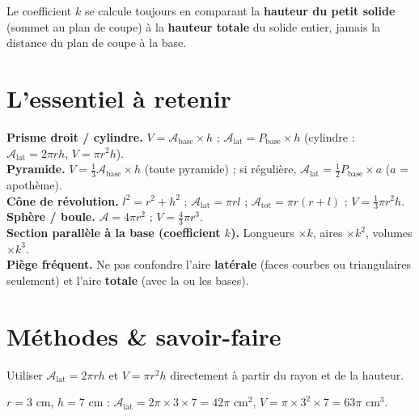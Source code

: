 \begin{remarque}
Le coefficient $k$ se calcule toujours en comparant la \textbf{hauteur du petit solide}
(sommet au plan de coupe) à la \textbf{hauteur totale} du solide entier, jamais la distance
du plan de coupe à la base.
\end{remarque}

\section{L'essentiel à retenir}

\begin{synthese}
\textbf{Prisme droit / cylindre.} $V=\mathcal{A}_{\text{base}}\times h$ ;
$\mathcal{A}_{\text{lat}}=P_{\text{base}}\times h$ (cylindre : $\mathcal{A}_{\text{lat}}=2\pi rh$,
$V=\pi r^{2}h$).\\[4pt]
\textbf{Pyramide.} $V=\frac13\mathcal{A}_{\text{base}}\times h$ (toute pyramide) ;
si régulière, $\mathcal{A}_{\text{lat}}=\frac12P_{\text{base}}\times a$ ($a$ = apothème).\\[4pt]
\textbf{Cône de révolution.} $l^{2}=r^{2}+h^{2}$ ; $\mathcal{A}_{\text{lat}}=\pi rl$ ;
$\mathcal{A}_{\text{tot}}=\pi r(r+l)$ ; $V=\frac13\pi r^{2}h$.\\[4pt]
\textbf{Sphère / boule.} $\mathcal{A}=4\pi r^{2}$ ; $V=\frac43\pi r^{3}$.\\[4pt]
\textbf{Section parallèle à la base (coefficient $k$).} Longueurs $\times k$, aires
$\times k^{2}$, volumes $\times k^{3}$.\\[4pt]
\textbf{Piège fréquent.} Ne pas confondre l'aire \textbf{latérale} (faces courbes ou
triangulaires seulement) et l'aire \textbf{totale} (avec la ou les bases).
\end{synthese}

\section{Méthodes \& savoir-faire}

Utiliser $\mathcal{A}_{\text{lat}}=2\pi rh$ et $V=\pi r^{2}h$ directement à partir du rayon
et de la hauteur.
\begin{exemple}
$r=3$ cm, $h=7$ cm : $\mathcal{A}_{\text{lat}}=2\pi\times3\times7=42\pi$ cm$^{2}$,
$V=\pi\times3^{2}\times7=63\pi$ cm$^{3}$.
\end{exemple}

